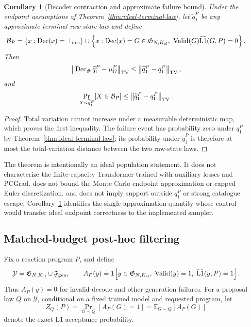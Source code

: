 \documentclass{article}
\newtheorem{corollary}[theorem]{Corollary}
\begin{document}
\begin{corollary}[Decoder contraction and approximate failure bound]
\label{cor:decoder-contraction}
Under the endpoint assumptions of Theorem~\ref{thm:ideal-terminal-law}, let
$\widetilde q_1^P$ be any approximate terminal raw-state law and define
\begin{equation}
 \mathcal B_P=
 \{x:\operatorname{Dec}(x)=\bot_{\rm dec}\}
 \cup
 \left\{x:\operatorname{Dec}(x)=G\in\mathfrak G_{N,K_{\rm cl}},\
 \mathrm{Valid}(G)\widehat{\mathrm{L1}}(G,P)=0\right\}.
\end{equation}
Then
\begin{equation}
 \left\|
 \operatorname{Dec}_{\#}\widetilde q_1^P-\mu_G^P
 \right\|_{\rm TV}
 \leq
 \left\|\widetilde q_1^P-q_1^P\right\|_{\rm TV},
\end{equation}
and
\begin{equation}
 \Pr_{X\sim\widetilde q_1^P}[X\in\mathcal B_P]
 \leq
 \left\|\widetilde q_1^P-q_1^P\right\|_{\rm TV}.
\end{equation}
\end{corollary}

\begin{proof}
Total variation cannot increase under a measurable deterministic map, which proves the first
inequality. The failure event has probability zero under $q_1^P$ by
Theorem~\ref{thm:ideal-terminal-law}; its probability under $\widetilde q_1^P$ is therefore at most
the total-variation distance between the two raw-state laws.
\end{proof}

The theorem is intentionally an ideal population statement. It does not characterize the
finite-capacity Transformer trained with auxiliary losses and PCGrad, does not bound the
Monte Carlo endpoint approximation or capped Euler discretization, and does not imply support
outside $q_1^P$ or strong catalogue escape. Corollary~\ref{cor:decoder-contraction} identifies the
single approximation quantity whose control would transfer ideal endpoint correctness to the
implemented sampler.

\subsection{Matched-budget post-hoc filtering}

Fix a reaction program $P$, and define
\begin{equation}
    \mathcal Y=\mathfrak G_{N,K_{\rm cl}}\cup\mathfrak F_{\rm gen},
    \qquad A_P(y)
    =
    \mathbf{1}\!\left[
        y\in\mathfrak G_{N,K_{\rm cl}},\;
        \mathrm{Valid}(y)=1,\;
        \widehat{\mathrm{L1}}(y,P)=1
    \right].
\end{equation}
Thus $A_P(y)=0$ for invalid-decode and other generation failures. For a proposal law $Q$ on
$\mathcal Y$, conditional on a fixed trained model and requested program, let
\begin{equation}
    Z_Q(P)
    =
    \Pr_{G\sim Q}[A_P(G)=1]
    =
    \mathbb{E}_{G\sim Q}\!\left[A_P(G)\right]
\end{equation}
denote the exact-L1 acceptance probability.
\end{document}
